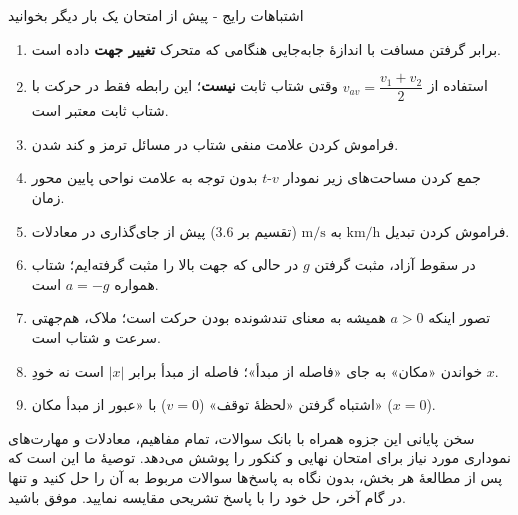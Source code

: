 \documentclass[12pt, a4paper]{article}
\begin{document}
\begin{tipbox}{اشتباهات رایج - پیش از امتحان یک بار دیگر بخوانید}
\begin{enumerate}
    \item برابر گرفتن مسافت با اندازهٔ جابه‌جایی هنگامی که متحرک \textbf{تغییر جهت} داده است.
    \item استفاده از $v_{av} = \dfrac{v_1+v_2}{2}$ وقتی شتاب ثابت \textbf{نیست}؛ این رابطه فقط در حرکت با شتاب ثابت معتبر است.
    \item فراموش کردن علامت منفی شتاب در مسائل ترمز و کند شدن.
    \item جمع کردن مساحت‌های زیر نمودار $v$-$t$ بدون توجه به علامت نواحی پایین محور زمان.
    \item فراموش کردن تبدیل $\text{km/h}$ به $\text{m/s}$ (تقسیم بر $3.6$) پیش از جای‌گذاری در معادلات.
    \item در سقوط آزاد، مثبت گرفتن $g$ در حالی که جهت بالا را مثبت گرفته‌ایم؛ شتاب همواره $a = -g$ است.
    \item تصور اینکه $a > 0$ همیشه به معنای تندشونده بودن حرکت است؛ ملاک، هم‌جهتی سرعت و شتاب است.
    \item خواندن «مکان» به جای «فاصله از مبدأ»؛ فاصله از مبدأ برابر $|x|$ است نه خودِ $x$.
    \item اشتباه گرفتن «لحظهٔ توقف» ($v=0$) با «عبور از مبدأ مکان» ($x=0$).
\end{enumerate}
\end{tipbox}

\begin{summarybox}{سخن پایانی}
این جزوه همراه با بانک سوالات، تمام مفاهیم، معادلات و مهارت‌های نموداری مورد نیاز برای امتحان نهایی و کنکور را پوشش می‌دهد. توصیهٔ ما این است که پس از مطالعهٔ هر بخش، بدون نگاه به پاسخ‌ها سوالات مربوط به آن را حل کنید و تنها در گام آخر، حل خود را با پاسخ تشریحی مقایسه نمایید. موفق باشید.
\end{summarybox}

\end{document}
